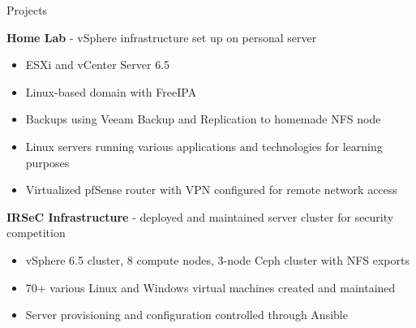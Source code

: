 \documentclass{resume} %
\begin{document}
\begin{rSection}{Projects}

    {\bf Home Lab} - vSphere infrastructure set up on personal server
    \begin{itemize}
        \item ESXi and vCenter Server 6.5
        \item Linux-based domain with FreeIPA
        \item Backups using Veeam Backup and Replication to homemade NFS node
        \item Linux servers running various applications and technologies for
            learning purposes
        \item Virtualized pfSense router with VPN configured for remote network
            access
    \end{itemize}

    {\bf IRSeC Infrastructure} - deployed and maintained server cluster for
    security competition
    \begin{itemize}
        \item vSphere 6.5 cluster, 8 compute nodes, 3-node Ceph cluster with
            NFS exports
        \item 70+ various Linux and Windows virtual machines created and
            maintained
        \item Server provisioning and configuration controlled through Ansible
    \end{itemize}

\end{rSection}

\end{document}

